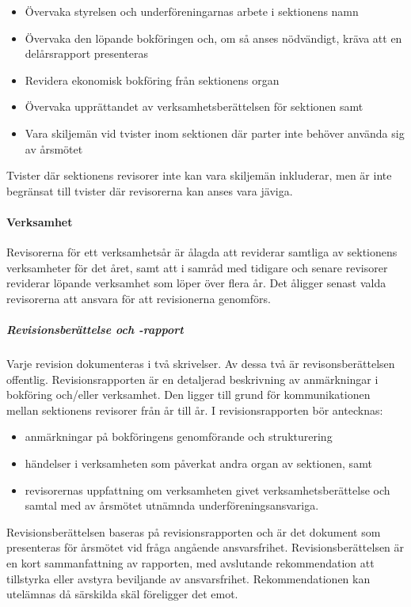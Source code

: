 \documentclass{../resources/dgovdoc}
\begin{document}
\begin{itemize}
\item Övervaka styrelsen och underföreningarnas arbete i sektionens namn
\item Övervaka den löpande bokföringen och, om så anses nödvändigt, kräva att en delårsrapport presenteras
\item Revidera ekonomisk bokföring från sektionens organ
\item Övervaka upprättandet av verksamhetsberättelsen för sektionen samt 
\item Vara skiljemän vid tvister inom sektionen där parter inte behöver använda sig av årsmötet
\end{itemize}

Tvister där sektionens revisorer inte kan vara skiljemän inkluderar,
men är inte begränsat till tvister där revisorerna kan anses vara jäviga. 

\paragraph{Verksamhet}

Revisorerna för ett verksamhetsår är ålagda att reviderar samtliga av sektionens verksamheter
för det året, samt att i samråd med tidigare och senare revisorer reviderar löpande verksamhet som löper över flera år.
Det åligger senast valda revisorerna att ansvara för att revisionerna genomförs.

\subparagraph{Revisionsberättelse och -rapport} 

Varje revision dokumenteras i två skrivelser. Av dessa två är revisonsberättelsen offentlig. 
Revisionsrapporten är en detaljerad beskrivning av anmärkningar i bokföring och/eller verksamhet.
Den ligger till grund för kommunikationen mellan sektionens revisorer från år till år. I revisionsrapporten bör antecknas:

\begin{itemize}
\item anmärkningar på bokföringens genomförande och strukturering
\item händelser i verksamheten som påverkat andra organ av sektionen, samt
\item revisorernas uppfattning om verksamheten givet verksamhetsberättelse och samtal med av årsmötet utnämnda underföreningsansvariga.
\end{itemize}

Revisionsberättelsen baseras på revisionsrapporten och är det dokument som presenteras för årsmötet vid fråga angående ansvarsfrihet. Revisionsberättelsen är en kort sammanfattning av rapporten, med avslutande rekommendation att tillstyrka eller avstyra beviljande av ansvarsfrihet. Rekommendationen kan utelämnas då särskilda skäl föreligger det emot.
\end{document}

